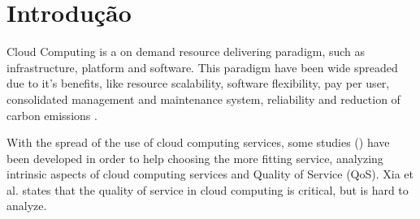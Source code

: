 \documentclass[conference]{IEEEtran}
\begin{document}




%
\IEEEpeerreviewmaketitle



\section{Introdução}


Cloud Computing is a on demand resource delivering paradigm, such as infrastructure, platform and software. This paradigm have been wide spreaded
due to it's benefits, like resource scalability, software flexibility, pay per user, consolidated management and maintenance system, reliability 
and reduction of carbon emissions \cite{rehman2011teaching}.


With the spread of the use of cloud computing services, some studies (\cite{soltani2016, garg2011, li2012, 
bardsiri2014, lesun2016, quarati2016}) have been developed in order to help choosing the more fitting service, 
analyzing intrinsic aspects of cloud computing services and Quality of Service (QoS). Xia et al. \cite{xia2013} states that the 
quality of service in cloud computing is critical, but is hard to analyze.
\end{document}
